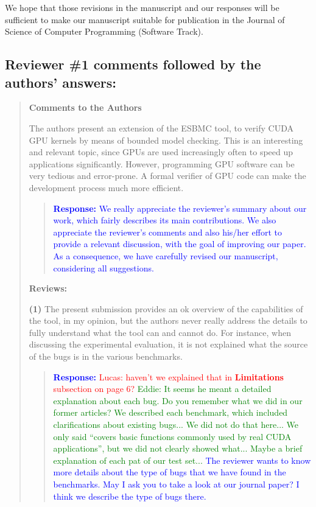 \documentclass[11pt]{article}
\newcommand\vi{\vspace{\baselineskip}}
\begin{document}
\vi

We hope that those revisions in the manuscript and our responses will be sufficient to make our manuscript suitable for publication in the Journal of Science of Computer Programming (Software Track).

\newpage

\vi
\subsection*{Reviewer \#1 comments followed by the authors' answers:}

\begin{quote}

{\bf Comments to the Authors}

The authors present an extension of the ESBMC tool, to verify CUDA GPU kernels by means of bounded model checking. This is an interesting and relevant topic, since GPUs are used increasingly often to speed up applications significantly. However, programming GPU software can be very tedious and error-prone. A formal verifier of GPU code can make the development process much more efficient.

\begin{quote}
\textcolor{blue}{\textbf{Response:} We really appreciate the reviewer's summary about our work, which fairly describes its main contributions. We also appreciate the reviewer's comments and also his/her effort to provide a relevant discussion, with the goal of improving our paper. As a consequence, we have carefully revised our manuscript, considering all suggestions.}
\end{quote}

{\bf Reviews:}

{\bf (1)} The present submission provides an ok overview of the capabilities of the tool, in my opinion, but the authors never really address the details to fully understand what the tool can and cannot do. For instance, when discussing the experimental evaluation, it is not explained what the source of the bugs is in the various benchmarks.

\begin{quote}
\textcolor{blue}{\textbf{Response:} \textcolor{red}{Lucas: haven't we explained that in {\bf Limitations} subsection on page 6?} \textcolor{green}{Eddie: It seems he meant a detailed explanation about each bug. Do you remember what we did in our former articles? We described each benchmark, which included clarifications about existing bugs... We did not do that here... We only said ``covers basic functions commonly used by real CUDA applications'', but we did not clearly showed what... Maybe a brief explanation of each pat of our test set...} The reviewer wants to know more details about the type of bugs that we have found in the benchmarks. May I ask you to take a look at our journal paper? I think we describe the type of bugs there. }
\end{quote}


\end{quote}
\end{document}
